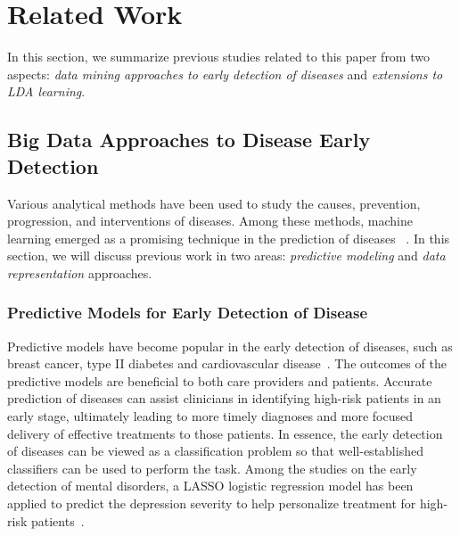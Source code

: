 \section{Related Work}\label{sec:2}

In this section, we summarize previous studies related to this paper from two aspects: \emph{data mining approaches to early detection of diseases} and \emph{extensions to LDA learning}.

\subsection{Big Data Approaches to Disease Early Detection}

Various analytical methods have been used to study the causes, prevention, progression, and interventions of diseases.
Among these methods, machine learning emerged as a promising technique in the prediction of diseases ~\cite{maroco_data_2011,huang_toward_2014}.
In this section, we will discuss previous work in two areas: \emph{predictive modeling} and \emph{data representation} approaches.


\subsubsection{Predictive Models for Early Detection of Disease} 

Predictive models have become popular in the early detection of diseases, such as breast cancer, type II diabetes and cardiovascular disease~\cite{Lindstrom01032003,riskprediction,zheng_predictive_2015,yoo_data_2011}.
The outcomes of the predictive models are beneficial to both care providers and patients.
Accurate prediction of diseases can assist clinicians in identifying high-risk patients in an early stage, ultimately leading to more timely diagnoses and more focused delivery of effective treatments to those patients.
In essence, the early detection of diseases can be viewed as a classification problem so that well-established classifiers can be used to perform the task.
Among the studies on the early detection of mental disorders, a LASSO logistic regression model has been applied to predict the depression severity to help personalize treatment for high-risk patients~\cite{huang_toward_2014}.
  
